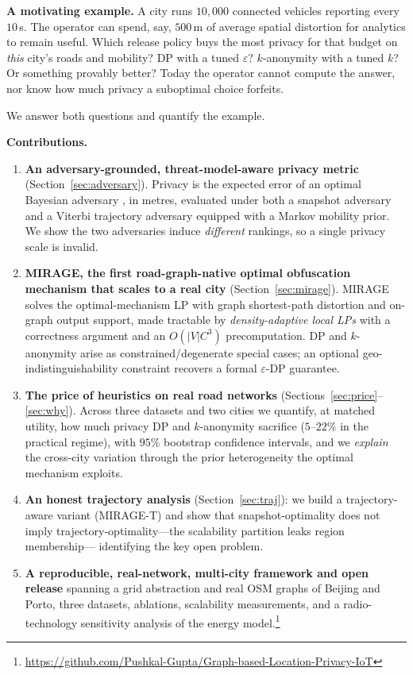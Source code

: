 \documentclass[11pt]{article}
\begin{document}
\smallskip
\noindent\textbf{A motivating example.} A city runs $10{,}000$ connected vehicles
reporting every $10$\,s. The operator can spend, say, $500$\,m of average spatial
distortion for analytics to remain useful. Which release policy buys the most
privacy for that budget on \emph{this} city's roads and mobility? DP with a tuned
$\varepsilon$? $k$-anonymity with a tuned $k$? Or something provably better? Today
the operator cannot compute the answer, nor know how much privacy a suboptimal
choice forfeits.

\smallskip
We answer both questions and quantify the example.

\noindent\textbf{Contributions.}
\begin{enumerate}
\item \textbf{An adversary-grounded, threat-model-aware privacy metric}
(Section~\ref{sec:adversary}). Privacy is the expected error of an optimal
Bayesian adversary \cite{shokri2011}, in metres, evaluated under both a snapshot
adversary and a Viterbi trajectory adversary equipped with a Markov mobility
prior. We show the two adversaries induce \emph{different} rankings, so a single
privacy scale is invalid.
\item \textbf{MIRAGE, the first road-graph-native optimal obfuscation mechanism
that scales to a real city} (Section~\ref{sec:mirage}). MIRAGE solves the
optimal-mechanism LP with graph shortest-path distortion and on-graph output
support, made tractable by \emph{density-adaptive local LPs} with a correctness
argument and an $O(|V|C^3)$ precomputation. DP and $k$-anonymity arise as
constrained/degenerate special cases; an optional geo-indistinguishability
constraint recovers a formal $\varepsilon$-DP guarantee.
\item \textbf{The price of heuristics on real road networks}
(Sections~\ref{sec:price}--\ref{sec:why}). Across three datasets and two cities we
quantify, at matched utility, how much privacy DP and $k$-anonymity sacrifice
($5\text{--}22\%$ in the practical regime), with $95\%$ bootstrap confidence
intervals, and we \emph{explain} the cross-city variation through the prior
heterogeneity the optimal mechanism exploits.
\item \textbf{An honest trajectory analysis} (Section~\ref{sec:traj}): we build a
trajectory-aware variant (MIRAGE-T) and show that snapshot-optimality does not
imply trajectory-optimality---the scalability partition leaks region membership---
identifying the key open problem.
\item \textbf{A reproducible, real-network, multi-city framework and open release}
spanning a grid abstraction and real OSM graphs of Beijing and Porto, three
datasets, ablations, scalability measurements, and a radio-technology sensitivity
analysis of the energy model.\footnote{\url{https://github.com/Pushkal-Gupta/Graph-based-Location-Privacy-IoT}}
\end{enumerate}
\end{document}
